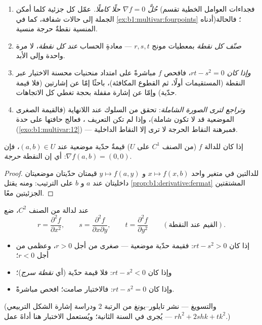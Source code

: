 \begin{method}
\label{met:b1:multivar:extremamethod}
\begin{enumerate}
  \item \emph{حُلَّ $\nabla f = 0$ حلًا كاملًا.} عمّل كل
         جزئية كلما أمكن (فجداءات العوامل الخطية
        تقسم الجملة إلى حالات شفافة، كما في
        \cref{ex:b1:multivar:fourpoints} أدناه)؛ فالحالة
        المنسية نقطةٌ حرجة منسية.
  \item \emph{صنّف كل نقطة} بمعطيات مونج $r, s,
        t$ --- معادةِ الحساب \emph{عند كل نقطة}، لا مرة واحدة
        وإلى الأبد.
  \item \emph{وإذا كان $rt - s^2 = 0$}، فافحص $f$ مباشرةً على امتداد
        منحنيات محسنة الاختيار عبر النقطة (المستقيمات أولًا، ثم
        القطوع المكافئة)، باحثًا إمّا عن إشارتين (فلا قيمة حدّية)
        وإمّا عن إشارة مقفلة بحجة تغطي كل
        الاتجاهات.
  \item \emph{وتراجع لترى الصورة الشاملة}: تحقق من
        السلوك عند اللانهاية (فالقيمة الصغرى الموضعية قد لا تكون
        شاملة)، وإذا لم تكن  التعريف ، فعالج حافتها
        على حدة (\cref{exo:b1:multivar:12}) --- فمبرهنة النقاط
        الحرجة لا ترى إلا النقاط الداخلية.
\end{enumerate}
\end{method}

\begin{theorem}\label{thm:b1:multivar:critical}
إذا كان للدالة $f$ (من الصنف $C^1$ على  $U$) قيمةٌ حدّية موضعية عند $(a,b)
\in U$، فإن $\nabla f(a,b) = (0,0)$: أي إن النقطة
\emph{حرجة}.
\end{theorem}

\begin{proof}
للدالتين في متغير واحد $x \mapsto f(x, b)$ و $y \mapsto f(a,
y)$ قيمتان حدّيتان موضعيتان داخليتان عند $a$ و $b$ على الترتيب:
ومنه يقتل \cref{prop:b1:derivative:fermat} المشتقتين الجزئيتين معًا.
\end{proof}

\begin{method}\label{met:b1:multivar:monge}
عند  لدالة من الصنف $C^2$، ضع
\[
r = \frac{\partial^2 f}{\partial x^2},
\qquad
s = \frac{\partial^2 f}{\partial x \partial y},
\qquad
t = \frac{\partial^2 f}{\partial y^2}
\qquad (\text{القيم عند النقطة}).
\]
\begin{itemize}
  \item إذا كان $rt - s^2 > 0$: فقيمة حدّية موضعية --- صغرى من أجل $r > 0$،
        وعظمى من أجل $r < 0$؛
  \item وإذا كان $rt - s^2 < 0$: فلا قيمة حدّية (أي \emph{نقطة
        سرج})؛
  \item وإذا كان $rt - s^2 = 0$: فالاختبار صامت؛ افحص مباشرةً.
\end{itemize}
(والتسويغ --- نشر تايلور--يونغ من الرتبة $2$ ودراسة
إشارة الشكل التربيعي $r h^2 + 2shk + tk^2$ --- يُجرى
في السنة الثانية؛ ويُستعمل الاختبار هنا أداةَ عمل.)
\end{method}


